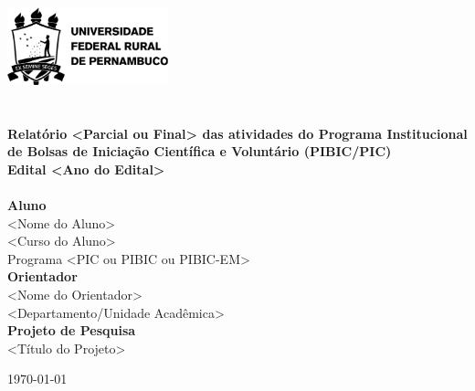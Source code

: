 \begin{titlepage}
\begin{center}

\includegraphics[width=0.35\textwidth]{images/ufrpe_logo_preto.png}~
\\[2cm]

\textsc{}
\\[2cm]

\HRule \\[0.4cm]
{\large \bfseries Relatório <Parcial ou Final> das atividades do Programa Institucional \\
de Bolsas de Iniciação Científica e Voluntário (PIBIC/PIC) \\
Edital <Ano do Edital>\\[0.4cm]}
\HRule 
\\[2cm]

\large\textbf{Aluno}\\
<Nome do Aluno>\\
<Curso do Aluno> \\
Programa <PIC ou PIBIC ou PIBIC-EM>
\\[1cm]

\large\textbf{Orientador}\\
<Nome do Orientador>\\
<Departamento/Unidade Acadêmica>
\\[1cm]

\large\textbf{Projeto de Pesquisa}\\
<Título do Projeto>\\[1cm]


\vfill

{\large \today}

\end{center}
\end{titlepage}